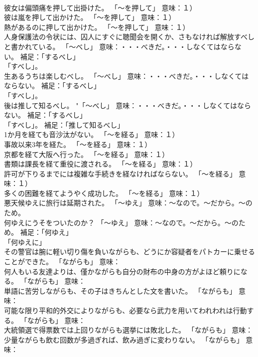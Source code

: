 \documentclass[8pt]{extreport}
\begin{document}
\begin{CJK}{UTF8}{min}
\\	彼女は偏頭痛を押して出掛けた。	「～を押して」 意味：１）
\\	彼は嵐を押して出かけた。	「～を押して」 意味：１）
\\	熱があるのに押して出かけた。	「～を押して」 意味：１）
\\	人身保護法の令状には、囚人にすぐに聴聞会を開くか、さもなければ解放すべしと書かれている。	「～べし」 意味：・・・べきだ。・・・しなくてはならない。 補足：「するべし」
\\	「すべし」。	
\\	生あるうちは楽しむべし。	「～べし」 意味：・・・べきだ。・・・しなくてはならない。 補足：「するべし」
\\	「すべし」。	
\\	後は推して知るべし。	"「～べし」 意味：・・・べきだ。・・・しなくてはならない。 補足：「するべし」
\\	「すべし」。 補足：「推して知るべし」
\\	1か月を経ても音沙汰がない。	「～を経る」 意味：１）
\\	事故以来3年を経た。	「～を経る」 意味：１）
\\	京都を経て大阪へ行った。	「～を経る」 意味：１）
\\	書類は課長を経て重役に渡される。	「～を経る」 意味：１）
\\	許可が下りるまでには複雑な手続きを経なければならない。	「～を経る」 意味：１）
\\	多くの困難を経てようやく成功した。	「～を経る」 意味：１）
\\	悪天候ゆえに旅行は延期された。	「～ゆえ」 意味：～なので。～だから。～のため。	
\\	何ゆえにうそをついたのか？	「～ゆえ」 意味：～なので。～だから。～のため。 補足：「何ゆえ」
\\	「何ゆえに」 
\\	その警官は腕に軽い切り傷を負いながらも、どうにか容疑者をパトカーに乗せることができた。	「ながらも」 意味：
\\	何人もいる友達よりは、僅かながらも自分の財布の中身の方がよほど頼りになる。	「ながらも」 意味：
\\	単語に苦労しながらも、その子はきちんとした文を書いた。	「ながらも」 意味：
\\	可能な限り平和的外交によりながらも、必要なら武力を用いてわれわれは行動する。	「ながらも」 意味：
\\	大統領選で得票数では上回りながらも選挙には敗北した。	「ながらも」 意味：
\\	少量ながらも飲む回数が多過ぎれば、飲み過ぎに変わりない。	「ながらも」 意味：

\end{CJK}
\end{document}
